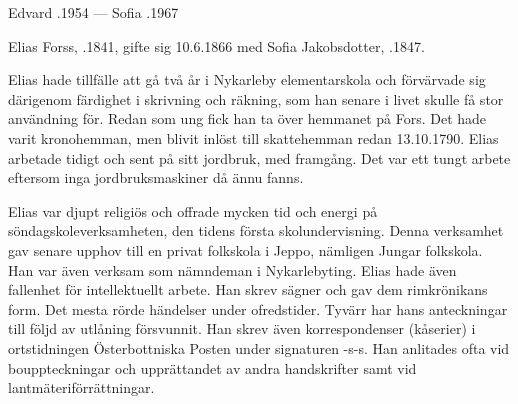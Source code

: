 Edvard .1954  ---  Sofia .1967


%
Elias Forss, .1841, gifte sig 10.6.1866 med Sofia Jakobsdotter, .1847.
\begin{jhchildren}
  \item {}
  \item {}
  \item {}
  \item {}
  \item {}
  \item {}
  \item {}
  \item {}
  \item {}
  \item {}
\end{jhchildren}

Elias hade tillfälle att gå två år i Nykarleby elementarskola och förvärvade sig därigenom färdighet i skrivning och räkning, som han senare i livet skulle få stor användning för. Redan som ung fick han ta över hemmanet på Fors. Det hade varit kronohemman, men blivit inlöst till skattehemman redan 13.10.1790. Elias arbetade tidigt och sent på sitt jordbruk, med framgång. Det var ett tungt arbete eftersom inga jordbruksmaskiner då ännu fanns.

Elias var djupt religiös och offrade mycken tid och energi på söndagskoleverksamheten, den tidens första skolundervisning. Denna verksamhet gav senare upphov till en privat folkskola i Jeppo, nämligen Jungar folkskola. Han var även verksam som nämndeman i Nykarlebyting. Elias hade även fallenhet för intellektuellt arbete. Han skrev sägner och gav dem rimkrönikans form. Det mesta rörde händelser under ofredstider. Tyvärr har hans anteckningar till följd av utlåning försvunnit. Han skrev även korrespondenser (kåserier) i ortstidningen Österbottniska Posten under signaturen -s-s. Han anlitades ofta vid bouppteckningar och upprättandet av andra handskrifter samt vid lantmäteriförrättningar.

